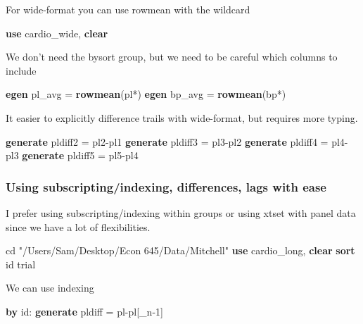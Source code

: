 \documentclass[
]{book}
\newenvironment{Shaded}{\begin{snugshade}}{\end{snugshade}}
\newcommand{\DataTypeTok}[1]{\textcolor[rgb]{0.13,0.29,0.53}{#1}}
\newcommand{\FunctionTok}[1]{\textcolor[rgb]{0.13,0.29,0.53}{\textbf{#1}}}
\newcommand{\KeywordTok}[1]{\textcolor[rgb]{0.13,0.29,0.53}{\textbf{#1}}}
\newcommand{\NormalTok}[1]{#1}
\newcommand{\StringTok}[1]{\textcolor[rgb]{0.31,0.60,0.02}{#1}}
\begin{document}
For wide-format you can use rowmean with the wildcard

\begin{Shaded}
\begin{Highlighting}[]
\KeywordTok{use}\NormalTok{ cardio\_wide, }\KeywordTok{clear}
\end{Highlighting}
\end{Shaded}

We don't need the bysort group, but we need to be careful which columns to include

\begin{Shaded}
\begin{Highlighting}[]
\KeywordTok{egen}\NormalTok{ pl\_avg = }\FunctionTok{rowmean}\NormalTok{(pl*)}
\KeywordTok{egen}\NormalTok{ bp\_avg = }\FunctionTok{rowmean}\NormalTok{(bp*)}
\end{Highlighting}
\end{Shaded}

It easier to explicitly difference trails with wide-format, but requires more typing.

\begin{Shaded}
\begin{Highlighting}[]
\KeywordTok{generate}\NormalTok{ pldiff2 = pl2{-}pl1}
\KeywordTok{generate}\NormalTok{ pldiff3 = pl3{-}pl2}
\KeywordTok{generate}\NormalTok{ pldiff4 = pl4{-}pl3}
\KeywordTok{generate}\NormalTok{ pldiff5 = pl5{-}pl4}
\end{Highlighting}
\end{Shaded}

\subsubsection{Using subscripting/indexing, differences, lags with ease}\label{using-subscriptingindexing-differences-lags-with-ease}

I prefer using subscripting/indexing within groups or using xtset with panel data since we have a lot of flexibilities.

\begin{Shaded}
\begin{Highlighting}[]
\NormalTok{cd }\StringTok{"/Users/Sam/Desktop/Econ 645/Data/Mitchell"}
\KeywordTok{use}\NormalTok{ cardio\_long, }\KeywordTok{clear}
\KeywordTok{sort}\NormalTok{ id trial}
\end{Highlighting}
\end{Shaded}

We can use indexing

\begin{Shaded}
\begin{Highlighting}[]
\KeywordTok{by}\NormalTok{ id: }\KeywordTok{generate}\NormalTok{ pldiff = pl{-}pl[}\DataTypeTok{\_n}\NormalTok{{-}1]}
\end{Highlighting}
\end{Shaded}
\end{document}
